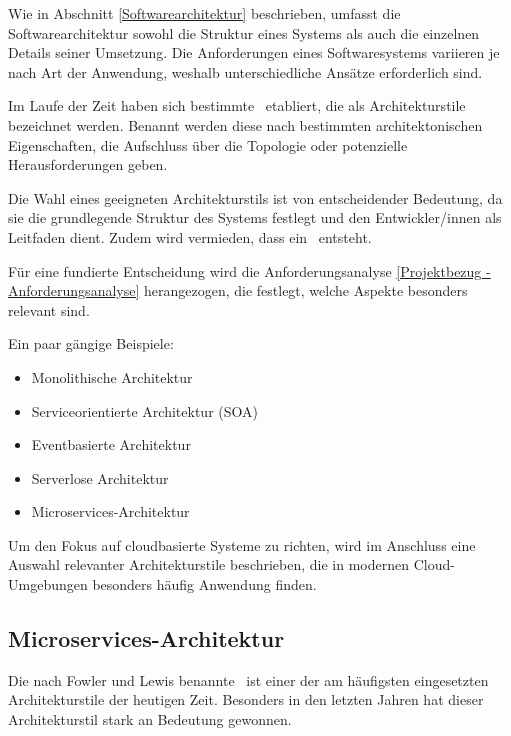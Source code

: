 
Wie in Abschnitt \ref{Softwarearchitektur} beschrieben, umfasst die Softwarearchitektur sowohl die Struktur eines Systems als auch die einzelnen Details seiner Umsetzung. Die Anforderungen eines Softwaresystems variieren je nach Art der Anwendung, weshalb unterschiedliche Ansätze erforderlich sind.

Im Laufe der Zeit haben sich bestimmte \grqq\ etabliert, die als Architekturstile bezeichnet werden. 
Benannt werden diese nach bestimmten architektonischen Eigenschaften, die Aufschluss über die Topologie oder potenzielle Herausforderungen geben.

Die Wahl eines geeigneten Architekturstils ist von entscheidender Bedeutung, da sie die grundlegende Struktur des Systems festlegt und den Entwickler/innen als Leitfaden dient. Zudem wird vermieden, dass ein \textbf{\grqq}\ entsteht. 

Für eine fundierte Entscheidung wird die Anforderungsanalyse \ref{Projektbezug - Anforderungsanalyse} herangezogen, die festlegt, welche Aspekte besonders relevant sind. 

Ein paar gängige Beispiele:
\begin{itemize}
    \item Monolithische Architektur
    \item Serviceorientierte Architektur (SOA)
    \item Eventbasierte Architektur
    \item Serverlose Architektur
    \item Microservices-Architektur
\end{itemize}

Um den Fokus auf cloudbasierte Systeme zu richten, wird im Anschluss eine Auswahl relevanter Architekturstile beschrieben, die in modernen Cloud-Umgebungen besonders häufig Anwendung finden. 
\cite[S. 125-126]{EA:Book02} \cite{EA:Web60}


\clearpage



    \subsection{Microservices-Architektur} \label{Microservices-Architektur}

    Die nach Fowler und Lewis benannte \grqq\ ist einer der am häufigsten eingesetzten Architekturstile der heutigen Zeit. Besonders in den letzten Jahren hat dieser Architekturstil stark an Bedeutung gewonnen.

